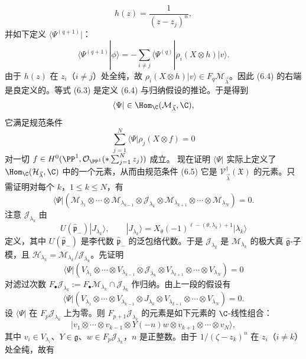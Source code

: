 \[
h(z)=\frac{1}{(z-z_j)^n},
\]
并如下定义 $\langle\Psi^{(q+1)}|$：
\begin{equation}
\langle\Psi^{(q+1)}|\phi\rangle=-\sum_{i\ne j}\langle\Psi^{(q)}|\rho_i(X\otimes h)|v\rangle.\tag{6.4}
\end{equation}
由于 $h(z)$ 在 $z_i$（$i\ne j$）处全纯，故 $\rho_i(X\otimes h)|v\rangle\in F_q\mathcal{M}_{\vec\lambda}$。因此 (6.4) 的右端是良定义的。等式 (6.3) 是定义 (6.4) 与归纳假设的推论。于是得到
\[
\langle\Psi|\in\Hom_{\C}(\mathcal{M}_{\vec\lambda},\C),
\]
它满足规范条件
\begin{equation}
\sum_{j=1}^{N}\langle\Psi|\rho_j(X\otimes f)=0\tag{6.5}
\end{equation}
对一切 $f\in H^0(\PP^1,\mathcal{O}_{\PP^1}(*\sum_{j=1}^{N}z_j))$ 成立。
现在证明 $\langle\Psi|$ 实际上定义了 $\Hom_{\C}(\mathcal{H}_{\vec\lambda},\C)$ 中的一个元素，从而由规范条件 (6.5) 它是 $\mathcal{V}^{\dagger}_{\vec\lambda}(\mathfrak{X})$ 的元素。只需证明对每个 $k$，$1\le k\le N$，有
\begin{equation}
\langle\Psi|(\mathcal{M}_{\lambda_1}\otimes\cdots\otimes\mathcal{M}_{\lambda_{k-1}}\otimes\mathcal{J}_{\lambda_k}\otimes\mathcal{M}_{\lambda_{k+1}}\otimes\cdots\otimes\mathcal{M}_{\lambda_N})=0.\tag{6.6}
\end{equation}
注意 $\mathcal{J}_{\lambda_k}$ 由
\[
U(\hat{\mathfrak{p}}_-)|J_{\lambda_k}\rangle,\qquad |J_{\lambda_k}\rangle=X_\theta(-1)^{\ell-(\theta,\lambda_k)+1}|\lambda_k\rangle
\]
定义，其中 $U(\hat{\mathfrak{p}}_-)$ 是李代数 $\hat{\mathfrak{p}}_-$ 的泛包络代数。于是 $\mathcal{J}_{\lambda_k}$ 是 $\mathcal{M}_{\lambda_k}$ 的极大真 $\hat{\mathfrak{g}}$-子模，且 $\mathcal{H}_{\lambda_k}=\mathcal{M}_{\lambda_k}/\mathcal{J}_{\lambda_k}$。先证明
\begin{equation}
\langle\Psi|(V_{\lambda_1}\otimes\cdots\otimes V_{\lambda_{k-1}}\otimes\mathcal{J}_{\lambda_k}\otimes V_{\lambda_{k+1}}\otimes\cdots\otimes V_{\lambda_N})=0\tag{6.7}
\end{equation}
对滤过次数 $F_\bullet\mathcal{J}_{\lambda_k}:=F_\bullet\mathcal{M}_{\lambda_k}\cap\mathcal{J}_{\lambda_k}$ 作归纳。由上一段的假设有
\[
\langle\Psi|(V_{\lambda_1}\otimes\cdots\otimes V_{\lambda_{k-1}}\otimes J_{\lambda_k}\otimes V_{\lambda_{k+1}}\otimes\cdots\otimes V_{\lambda_N})=0.
\]
设 $\langle\Psi|$ 在 $F_p\mathcal{J}_{\lambda_k}$ 上为零。则 $F_{p+1}\mathcal{J}_{\lambda_k}$ 的元素是如下元素的 $\C$-线性组合：
\[
|v_1\otimes\cdots\otimes v_{k-1}\otimes Y(-n)w\otimes v_{k+1}\otimes\cdots\otimes v_N\rangle,
\]
其中 $v_i\in V_{\lambda_i}$、$Y\in\mathfrak{g}$、$w\in F_p\mathcal{J}_{\lambda_k}$，$n$ 是正整数。由于 $1/(\zeta-z_k)^n$ 在 $z_i$（$i\ne k$）处全纯，故有

